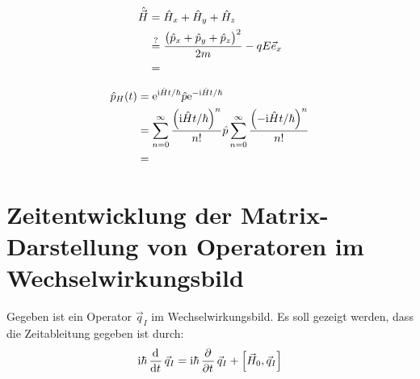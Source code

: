 \begin{align*}
 \hat{\vec H} &= \hat H_x + \hat H_y + \hat H_z\\
 &\overset{?}{=} \frac{\del{\hat p_x + \hat p_y + \hat p_z}^2}{2m} - qE \vec e_x\\
 &=
\end{align*}


\begin{align*}
 \hat p_H (t) &= \ee^{\ii \hat H t /\hbar} \hat p \ee^{-\ii \hat H t / \hbar}\\
 &= \sum_{n=0}^\infty \frac{\del{\ii \hat H t /\hbar}^n}{n!} \hat p \sum_{n=0}^\infty \frac{\del{-\ii \hat H t / \hbar}^n}{n!}\\
 &= 
\end{align*}



\section{Zeitentwicklung der Matrix-Darstellung von Operatoren im Wechselwirkungsbild}

Gegeben ist ein Operator $\vec{q}_I$ im Wechselwirkungsbild. Es soll gezeigt werden, dass die Zeitableitung gegeben ist durch:
\[
	\ii\hbar\dod{}{t}\vec{q}_I=\ii\hbar\dpd{}{t}\vec{q}_I+\left[\vec{H}_0,\vec{q}_I\right]
\]


